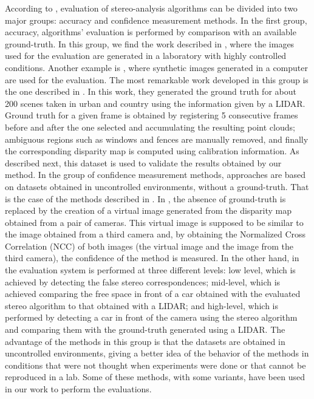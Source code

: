 According to \cite{Morales2012}, evaluation of stereo-analysis algorithms can be divided into two major groups: accuracy and confidence measurement methods.
In the first group, accuracy, algorithms' evaluation is performed by comparison with an available ground-truth. In this group, we find the work described in \cite{Steingrube2009}, where the images used for the evaluation are generated in a laboratory with highly controlled conditions. Another example is \cite{Vaudrey2008}, where synthetic images generated in a computer are used for the evaluation. The most remarkable work developed in this group is the one described in \cite{Geiger2012}. In this work, they generated the ground truth for about 200 scenes taken in urban and country using the information given by a \ac{LIDAR}. Ground truth for a given frame is obtained by registering 5 consecutive frames before and after the one selected and accumulating the resulting point clouds; ambiguous regions such as windows and fences are manually removed, and finally the corresponding 
disparity map is computed using calibration information. As described next, this dataset is used to validate the results obtained by our method.
In the group of confidence measurement methods, approaches are based on datasets obtained in uncontrolled environments, without a ground-truth. That is the case of the methods described in \cite{Morales2012, Steingrube2009}. In \cite{Morales2012}, the absence of ground-truth is replaced by the creation of a virtual image generated from the disparity map obtained from a pair of cameras. This virtual image is supposed to be similar to the image obtained from a third camera and, by obtaining the Normalized Cross Correlation (NCC) of both images (the virtual image and the image from the third camera), the confidence of the method is measured. In the other hand, in \cite{Steingrube2009} the evaluation system is performed at three different levels: low level, which is achieved by detecting the false stereo correspondences; mid-level, which is achieved comparing the free space in front of a car obtained with the evaluated stereo algorithm to that obtained with a LIDAR; and high-level, which is performed by 
detecting a car in front of the camera using the stereo algorithm and comparing them with the ground-truth generated using a LIDAR. The advantage of the methods in this group is that the datasets are obtained in uncontrolled environments, giving a better idea of the behavior of the methods in conditions that were not thought when experiments were done or that cannot be reproduced in a lab. Some of these methods, with some variants, have been used in our work to perform the evaluations.

